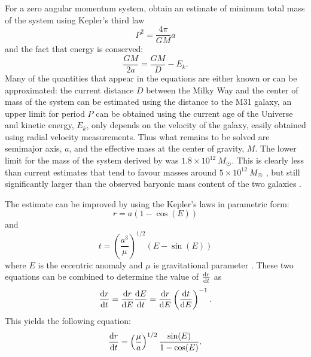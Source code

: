 \documentclass[english, oneside]{HYgradu}
\begin{document}
For a zero angular momentum system, \citeauthor{kahn1959intergalactic} obtain an estimate of minimum total mass of the system using Kepler's third law
\begin{equation}
P^2 = \frac{4\pi}{GM}a
\end{equation}
and the fact that energy is conserved:
\begin{equation}
\frac{GM}{2a} = \frac{GM}{D} - E_k.
\end{equation}
Many of the quantities that appear in the equations are either known or can be approximated: the current distance $D$ between the Milky Way and the center of mass of the system can be estimated using the distance to the M31 galaxy, an upper limit for period $P$ can be obtained using the current age of the Universe and kinetic energy, $E_k$, only depends on the velocity of the galaxy, easily obtained using radial velocity measurements. Thus what remains to be solved are semimajor axis, $a$, and the effective mass at the center of gravity, $M$. The lower limit for the mass of the system derived by \citeauthor{kahn1959intergalactic} was $1.8 \times 10^{12}~M_{\astrosun}$. This is clearly less than current estimates
that tend to favour masses around $5 \times 10^{12}~M_{\astrosun}$ \citep{li2008masses, fattahi2016apostle}, but still significantly larger than the observed baryonic mass content of the two galaxies \citep{kahn1959intergalactic}.

The estimate can be improved by using the Kepler's laws in parametric form:
\begin{equation}\label{kepler-r}
r = a(1-\cos(E))
\end{equation}
and
\begin{equation}\label{kepler-t}
t = \left(\frac{a^3}{\mu}\right)^{1/2}(E-\sin(E))
\end{equation}
where $E$ is the eccentric anomaly and $\mu$ is gravitational parameter \citep{li2008masses}. These two equations can be combined to determine the value of $\dv{r}{t}$ as
\begin{equation}
\dv{r}{t} = \dv{r}{E} \dv{E}{t} = \dv{r}{E} \left(\dv{t}{E}\right)^{-1}.
\end{equation}
This yields the following equation:
\begin{equation}\label{orbit-speed}
\dv{r}{t} = \left(\frac{\mu}{a}\right)^{1/2}\frac{\sin(E)}{1 - \cos(E)}.
\end{equation}
\end{document}
